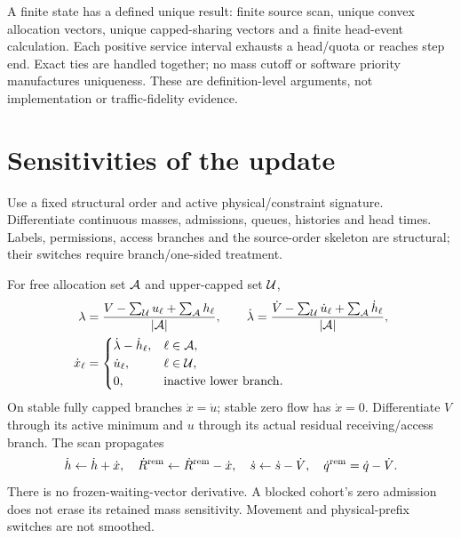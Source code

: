 \documentclass[10pt,a4paper]{article}
\begin{document}
A finite state has a defined unique result: finite source scan, unique
convex allocation vectors, unique capped-sharing vectors and a finite
head-event calculation. Each positive service interval exhausts a
head/quota or reaches step end. Exact ties are handled together; no
mass cutoff or software priority manufactures uniqueness. These are
definition-level arguments, not implementation or traffic-fidelity evidence.

\section{Sensitivities of the update}

Use a fixed structural order and active physical/constraint signature.
Differentiate continuous masses, admissions, queues, histories and head
times. Labels, permissions, access branches and the source-order skeleton
are structural; their switches require branch/one-sided treatment.

For free allocation set ${\cal A}$ and upper-capped set ${\cal U}$,
\begin{align}
 \lambda&=\frac{V-\sum_{\cal U}u_\ell+\sum_{\cal A}h_\ell}
                  {|{\cal A}|},\qquad
 \dot\lambda=\frac{\dot V-\sum_{\cal U}\dot u_\ell+
                                  \sum_{\cal A}\dot h_\ell}
                  {|{\cal A}|},\nonumber\\
 \dot x_\ell&=
 \begin{cases}
 \dot\lambda-\dot h_\ell,&\ell\in{\cal A},\\
 \dot u_\ell,&\ell\in{\cal U},\\
 0,&\text{inactive lower branch}.
 \end{cases}
 \label{eq:allocation-derivative}
\end{align}
On stable fully capped branches $\dot x=\dot u$; stable zero flow has
$\dot x=0$. Differentiate $V$ through its active minimum and $u$ through
its actual residual receiving/access branch. The scan propagates
\begin{equation}
 \dot h\leftarrow\dot h+\dot x,\quad
 \dot R^{\rm rem}\leftarrow\dot R^{\rm rem}-\dot x,\quad
 \dot s\leftarrow\dot s-\dot V,\quad
 \dot q^{\rm rem}=\dot q-\dot V .
 \label{eq:scan-derivative}
\end{equation}
There is no frozen-waiting-vector derivative. A blocked cohort's zero
admission does not erase its retained mass sensitivity. Movement and
physical-prefix switches are not smoothed.
\end{document}
